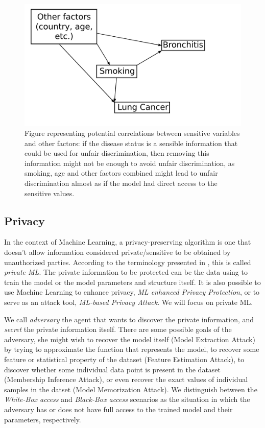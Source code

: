 \begin{figure}[ht]
\centering
\includegraphics[width=\textwidth]{correlated}
\caption{Figure representing potential correlations between sensitive variables and other factors: if the disease status is a sensible information that could be used for unfair discrimination, then removing this information might not be enough to avoid unfair discrimination, as smoking, age and other factors combined might lead to unfair discrimination almost as if the model had direct access to the sensitive values.}\label{fig:correlated}
\end{figure}

\subsection{Privacy}

In the context of Machine Learning, a privacy-preserving algorithm is one that doesn't allow information considered private/sensitive to be obtained by unauthorized parties. According to the terminology presented in \cite{liu2021machine}, this is called \emph{private ML}. The private information to be protected can be the data using to train the model or the model parameters and structure itself. It is also possible to use Machine Learning to enhance privacy, \emph{ML enhanced Privacy Protection}, or to serve as an attack tool, \emph{ML-based Privacy Attack}. We will focus on private ML.

We call \emph{adversary} the agent that wants to discover the private information, and \emph{secret} the private information itself. There are some possible goals of the adversary, she might wish to recover the model itself (Model Extraction Attack) by trying to approximate the function that represents the model, to recover some feature or statistical property of the dataset (Feature Estimation Attack), to discover whether some individual data point is present in the dataset (Membership Inference Attack), or even recover the exact values of individual samples in the datset (Model Memorization Attack). We distinguish between the \emph{White-Box access} and \emph{Black-Box access} scenarios as the situation in which the adversary has or does not have full access to the trained model and their parameters, respectively. 

